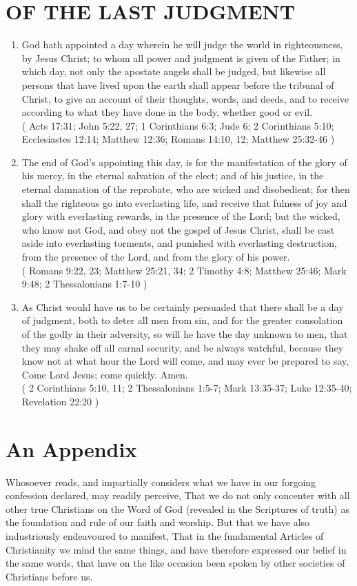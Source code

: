 \documentclass[12pt,a4paper]{book}
\begin{document}
\chapter{OF THE LAST JUDGMENT}
\label{ch-las-jud}
\begin{enumerate}
\item God hath appointed a day wherein he will judge the world in righteousness, by Jesus Christ; to whom all power and judgment is given of the Father; in which day, not only the apostate angels shall be judged, but likewise all persons that have lived upon the earth shall appear before the tribunal of Christ, to give an account of their thoughts, words, and deeds, and to receive according to what they have done in the body, whether good or evil.\\
( Acts 17:31; John 5:22, 27; 1 Corinthians 6:3; Jude 6; 2 Corinthians 5:10; Ecclesiastes 12:14; Matthew 12:36; Romans 14:10, 12; Matthew 25:32-46 )
\item The end of God's appointing this day, is for the manifestation of the glory of his mercy, in the eternal salvation of the elect; and of his justice, in the eternal damnation of the reprobate, who are wicked and disobedient; for then shall the righteous go into everlasting life, and receive that fulness of joy and glory with everlasting rewards, in the presence of the Lord; but the wicked, who know not God, and obey not the gospel of Jesus Christ, shall be cast aside into everlasting torments, and punished with everlasting destruction, from the presence of the Lord, and from the glory of his power.\\
( Romans 9:22, 23; Matthew 25:21, 34; 2 Timothy 4:8; Matthew 25:46; Mark 9:48; 2 Thessalonians 1:7-10 )
\item As Christ would have us to be certainly persuaded that there shall be a day of judgment, both to deter all men from sin, and for the greater consolation of the godly in their adversity, so will he have the day unknown to men, that they may shake off all carnal security, and be always watchful, because they know not at what hour the Lord will come, and may ever be prepared to say, Come Lord Jesus; come quickly. Amen.\\
( 2 Corinthians 5:10, 11; 2 Thessalonians 1:5-7; Mark 13:35-37; Luke 12:35-40; Revelation 22:20 )
\end{enumerate}

\backmatter
\chapter{An Appendix}
Whosoever reads, and impartially considers what we have in our forgoing confession declared, may readily perceive, That we do not only concenter with all other true Christians on the Word of God (revealed in the Scriptures of truth) as the foundation and rule of our faith and worship. But that we have also industriously endeavoured to manifest, That in the fundamental Articles of Christianity we mind the same things, and have therefore expressed our belief in the same words, that have on the like occasion been spoken by other societies of Christians before us.
\end{document}
